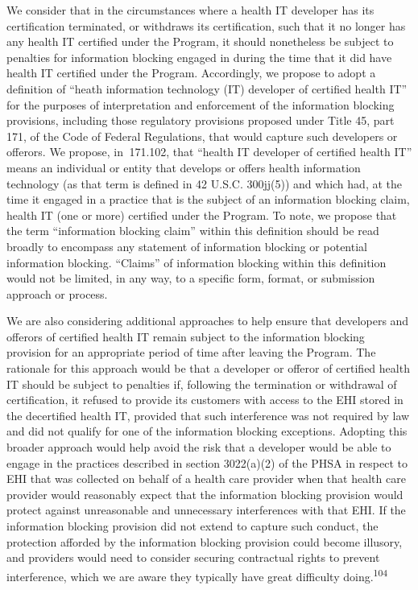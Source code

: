 \documentclass[twoside,11pt]{article}
\begin{document}
          We consider that in the circumstances where a health IT developer has its certification terminated, or withdraws its certification, such that it no longer has any health IT certified under the  \ifhmode\expandafter\xspace\fi Program, it should nonetheless be subject to penalties for information blocking engaged in during the time that it did have health IT certified under the Program. Accordingly, we propose to adopt a definition of “heath information technology (IT) developer of certified health IT” for the purposes of interpretation and enforcement of the information blocking provisions, including those regulatory provisions proposed under Title 45, part 171, of the Code of Federal Regulations, that would capture such developers or offerors. We propose, in \textsection{} 171.102, that “health IT developer of certified health IT” means an individual or entity that develops or offers health information technology (as that term is defined in 42 U.S.C. 300jj(5)) and which had, at the time it engaged in a practice that is the subject of an information blocking claim, health IT (one or more) certified under the Program. To note, we propose that the term “information blocking claim” within this definition should be read broadly to encompass any statement of information blocking or potential information blocking. “Claims” of information blocking within this definition would not be limited, in any way, to a specific form, format, or submission approach or process.


          We are also considering additional approaches to help ensure that developers and offerors of certified health IT remain subject to the information blocking provision for an appropriate period of time after leaving the Program. The rationale for this approach would be that a developer or offeror of certified health IT should be subject to penalties if, following the termination or withdrawal of certification, it refused to provide its customers with access to the EHI stored in the decertified health IT, provided that such interference was not required by law and did not qualify for one of the information blocking exceptions. Adopting this broader approach would help avoid the risk that a developer would be able to engage in the practices described in section 3022(a)(2) of the PHSA in respect to EHI that was collected on behalf of a health care provider when that health care provider would reasonably expect that the information blocking provision would protect against unreasonable and unnecessary interferences with that EHI. If the information blocking provision did not extend to capture such conduct, the protection afforded by the information blocking provision could become illusory, and providers would need to consider securing contractual rights to prevent interference, which we are aware they typically have great difficulty doing.\textsuperscript{104}
            
\end{document}
